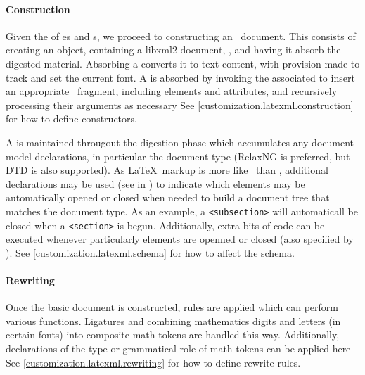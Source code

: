 \documentclass{book}
\newcommand{\xmlcode}{\lstinline[style=xml]}
\begin{document}
\paragraph{Construction}\label{architecture.latexml.construction}
%
%
%
Given the  of es and s,
we proceed to constructing an \XML\ document.
This consists of creating an  object, containing
a libxml2 document, , and having it absorb the digested
material. Absorbing a  converts it to text content, with provision
made to track and set the current font.
A  is absorbed by invoking the associated 
to insert an appropriate \XML\ fragment, including elements and attributes,
and recursively processing their arguments as necessary
See \ref{customization.latexml.construction} for how to define
constructors.

A  is maintained througout the digestion phase which accumulates
any document model declarations, in particular the document type (RelaxNG is
preferred, but DTD is also supported).  As \LaTeX\ markup is more
like \SGML\ than \XML, additional declarations may be used (see  in )
to indicate which elements may
be automatically opened or closed when needed to build a document tree that matches
the document type.  As an example, a \xmlcode{<subsection>} will automaticall be closed
when a \xmlcode{<section>} is begun.  Additionally, extra bits of code can
be executed whenever particularly elements are openned or closed (also
specified by ).
See \ref{customization.latexml.schema} for how to affect the schema.

\paragraph{Rewriting}\label{architecture.latexml.rewriting}
%
Once the basic document is constructed,  rules are applied which can
perform various functions. Ligatures and combining mathematics digits and letters (in certain fonts)
into composite math tokens are handled this way.  Additionally, declarations
of the type or grammatical role of math tokens can be applied here
See \ref{customization.latexml.rewriting} for how to define rewrite rules.
\end{document}
